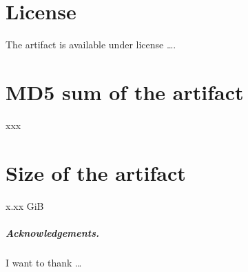 \documentclass[a4paper,UKenglish]{darts-v2018}
\newcommand{\license}[1]{{\section{License}#1}}
\newcommand{\mdsum}[1]{{\section{MD5 sum of the artifact}#1}}
\newcommand{\artifactsize}[1]{{\section{Size of the artifact}#1}}
\begin{document}
\license{The artifact is available under license \dots.}

\mdsum{xxx}

\artifactsize{x.xx GiB}

\subparagraph*{Acknowledgements.}

I want to thank \dots







\end{document}
